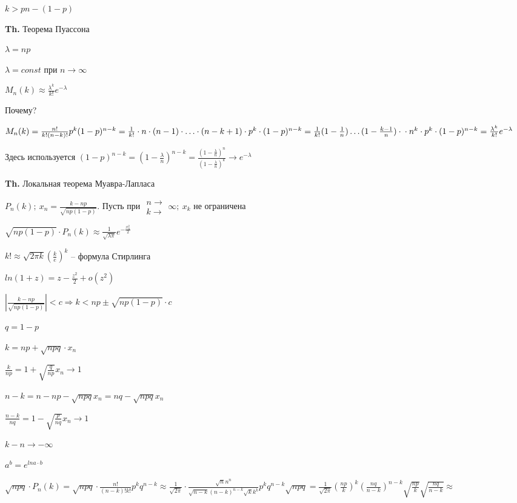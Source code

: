 \documentclass[14pt, letter paper]{article}
\begin{document}
$k > pn - (1-p)$

\vspace{5mm}

\textbf{Th.} Теорема Пуассона

$\lambda = np$

$\lambda = const$ при $n \rightarrow \infty$

$M_n(k) \approx \frac{\lambda^k}{k!} e^{-\lambda}$

Почему?

$M_n(k) = \frac{n!}{k!(n-k)!} p^k (1-p)^{n-k} = \frac{1}{k!} \cdot n \cdot (n-1) \cdot \ldots \cdot (n-k+1) \cdot p^k \cdot (1-p)^{n-k} = \frac{1}{k!} (1 - \frac{1}{n}) \ldots (1 - \frac{k-1}{n}) \cdot \\ \cdot n^k \cdot p^k \cdot (1-p)^{n-k} = \frac{\lambda^k}{k!} e^{-\lambda}$

Здесь используется $(1-p)^{n-k} = (1 - \frac{\lambda}{n})^{n-k} = \frac{(1 - \frac{\lambda}{n})^n}{(1 - \frac{\lambda}{n})^k} \rightarrow e^{-\lambda}$

\vspace{5mm}

\textbf{Th.} Локальная теорема Муавра-Лапласа

$P_n(k);\ x_n = \frac{k -np}{\sqrt{np(1-p)}}$. Пусть при $\begin{gathered}
    n \rightarrow \\
    k \rightarrow
\end{gathered} \infty;\ x_k$ не ограничена

$\sqrt{np(1-p)} \cdot P_n(k) \approx \frac{1}{\sqrt{\lambda \pi}} e^{-\frac{x_n^2}{2}}$

$k! \approx \sqrt{2\pi k} (\frac{k}{e})^k$ -- формула Стирлинга

$ln(1+z) = z - \frac{z^2}{2} + o(z^2)$

$|\frac{k-np}{\sqrt{np(1-p)}}| < c \Rightarrow k < np \pm \sqrt{np(1-p)} \cdot c$

$q = 1 - p$

$k = np + \sqrt{npq} \cdot x_n$

$\frac{k}{np} = 1 + \sqrt{\frac{q}{np}} x_n \rightarrow 1$

$n-k = n - np - \sqrt{npq} x_n = nq - \sqrt{npq} x_n$

$\frac{n-k}{nq} = 1 - \sqrt{\frac{p}{nq}} x_n \rightarrow 1$

$k - n \rightarrow - \infty$

$a^b = e^{lna \cdot b}$

$\sqrt{npq} \cdot P_n(k) = \sqrt{npq} \cdot \frac{n!}{(n-k)!k!}p^kq^{n-k} \approx \frac{1}{\sqrt{2\pi}} \cdot \frac{\sqrt{n}n^n}{\sqrt{n-k}(n-k)^{n-k}\sqrt{k}k^k} p^k q^{n-k} \sqrt{npq} = \frac{1}{\sqrt{2\pi}} (\frac{np}{k})^k(\frac{nq}{n-k})^{n-k}\sqrt{\frac{np}{k}}\sqrt{\frac{nq}{n-k}} \approx$
\end{document}
